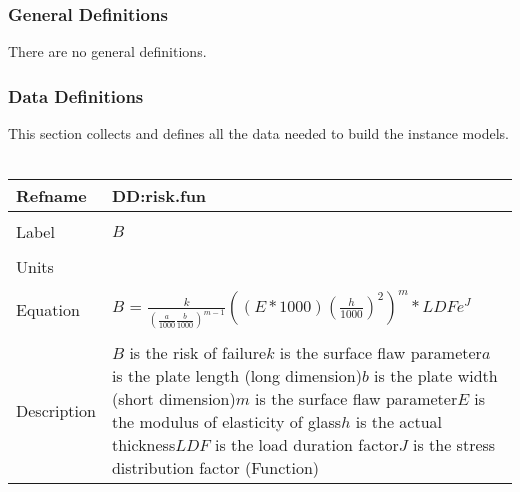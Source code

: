 \documentclass[12pt]{article}
\begin{document}
\subsubsection{General Definitions}
\label{Sec:GeneDefi}
There are no general definitions.
\subsubsection{Data Definitions}
\label{Sec:DataDefi}
This section collects and defines all the data needed to build the instance models.
~\newline
\noindent \begin{minipage}{\textwidth}
\begin{tabular}{p{} p{}}
\toprule \textbf{Refname} & \textbf{DD:risk.fun}
\label{DD:risk.fun}
\\ \midrule \\
Label & $B$
\\ \midrule \\
Units & 
\\ \midrule \\
Equation & $B$ = $\frac{k}{\left(\frac{a}{1000}\frac{b}{1000}\right)^{m-1}}\left(\left(E*1000\right)\left(\frac{h}{1000}\right)^{2}\right)^{m}*LDFe^{J}$
\\ \midrule \\
Description & $B$ is the risk of failure\newline$k$ is the surface flaw parameter\newline$a$ is the plate length (long dimension)\newline$b$ is the plate width (short dimension)\newline$m$ is the surface flaw parameter\newline$E$ is the modulus of elasticity of glass\newline$h$ is the actual thickness\newline$LDF$ is the load duration factor\newline$J$ is the stress distribution factor (Function)
\\ \bottomrule \end{tabular}
\end{minipage}\\
~\newline
\end{document}

